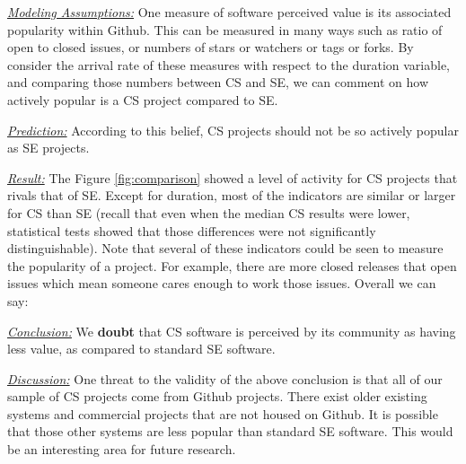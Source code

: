 \documentclass[sigconf,review,anonymous]{acmart}
\newenvironment{RQ}{\vspace{1mm}\begin{tcolorbox}[enhanced,width=3.4in,size=fbox,colback=red!5!white,drop shadow southeast,sharp corners]}{\end{tcolorbox}}
\begin{document}
\noindent \textit{\underline{Modeling Assumptions:}} 
One measure of software perceived value is its associated popularity within Github. This can be measured in many ways such as ratio of open to closed issues, or
numbers of stars or watchers or tags or forks. By consider the arrival rate of these measures with respect to the duration variable, and comparing those numbers between CS and SE, we can comment on how actively popular is a CS project compared to SE.

\noindent \textit{\underline{Prediction:}} 
According to this belief, CS projects should not be so actively popular as SE projects.



\noindent \textit{\underline{Result:}} 
The Figure \ref{fig:comparison} showed a
level of activity for CS projects that rivals that of SE.
Except for duration, most of the indicators are similar or larger for CS than SE
(recall that even when the median CS results were lower, statistical tests showed that those differences
were not significantly distinguishable). Note that several of these indicators could be seen
to measure the popularity of a project. For example,
there are more closed releases that open issues which mean someone cares enough to work those issues.
Overall we can say:


\begin{RQ}
\textit{\underline{Conclusion:}} 
We  \textbf{doubt} that CS software is perceived by its community as having less value,
as compared to standard SE software.
\end{RQ}

\noindent \textit{\underline{Discussion:}} 
One threat to the validity of the above conclusion is that all of our sample of CS projects come from Github projects.
 There exist older existing systems and commercial projects that are not housed on Github. It is possible that those other systems are less popular than standard SE software. This would be an interesting area for future research.
  
\end{document}
